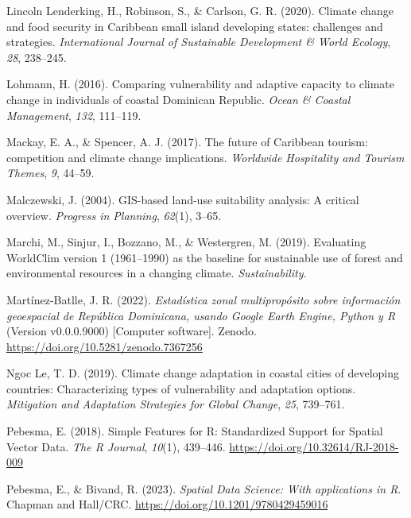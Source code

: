\documentclass[spanish]{article}
\newlength{\cslhangindent}
\newlength{\cslentryspacingunit} %
\newenvironment{CSLReferences}[2] %
 {%
  \setlength{\parindent}{0pt}
  \ifodd #1
  \let\oldpar\par
  \def\par{\hangindent=\cslhangindent\oldpar}
  \fi
  \setlength{\parskip}{#2\cslentryspacingunit}
 }%
 {}
\begin{document}
\begin{CSLReferences}{1}{0}
\leavevmode{}%
Lincoln Lenderking, H., Robinson, S., \& Carlson, G. R. (2020). {Climate
change and food security in Caribbean small island developing states:
challenges and strategies}. \emph{International Journal of Sustainable
Development \& World Ecology}, \emph{28}, 238--245.

\leavevmode{}%
Lohmann, H. (2016). {Comparing vulnerability and adaptive capacity to
climate change in individuals of coastal Dominican Republic}.
\emph{Ocean \& Coastal Management}, \emph{132}, 111--119.

\leavevmode{}%
Mackay, E. A., \& Spencer, A. J. (2017). {The future of Caribbean
tourism: competition and climate change implications}. \emph{Worldwide
Hospitality and Tourism Themes}, \emph{9}, 44--59.

\leavevmode{}%
Malczewski, J. (2004). GIS-based land-use suitability analysis: A
critical overview. \emph{Progress in Planning}, \emph{62}(1), 3--65.

\leavevmode{}%
Marchi, M., Sinjur, I., Bozzano, M., \& Westergren, M. (2019).
Evaluating WorldClim version 1 (1961--1990) as the baseline for
sustainable use of forest and environmental resources in a changing
climate. \emph{Sustainability}.

\leavevmode{}%
Martínez-Batlle, J. R. (2022). \emph{{Estadística zonal multipropósito
sobre información geoespacial de República Dominicana, usando Google
Earth Engine, Python y R}} (Version v0.0.0.9000) {[}Computer
software{]}. Zenodo. \url{https://doi.org/10.5281/zenodo.7367256}

\leavevmode{}%
Ngoc Le, T. D. (2019). Climate change adaptation in coastal cities of
developing countries: Characterizing types of vulnerability and
adaptation options. \emph{Mitigation and Adaptation Strategies for
Global Change}, \emph{25}, 739--761.

\leavevmode{}%
Pebesma, E. (2018). {Simple Features for R: Standardized Support for
Spatial Vector Data}. \emph{{The R Journal}}, \emph{10}(1), 439--446.
\url{https://doi.org/10.32614/RJ-2018-009}

\leavevmode{}%
Pebesma, E., \& Bivand, R. (2023). \emph{{Spatial Data Science: With
applications in R}}. {Chapman and Hall/CRC}.
\url{https://doi.org/10.1201/9780429459016}


\end{CSLReferences}
\end{document}
